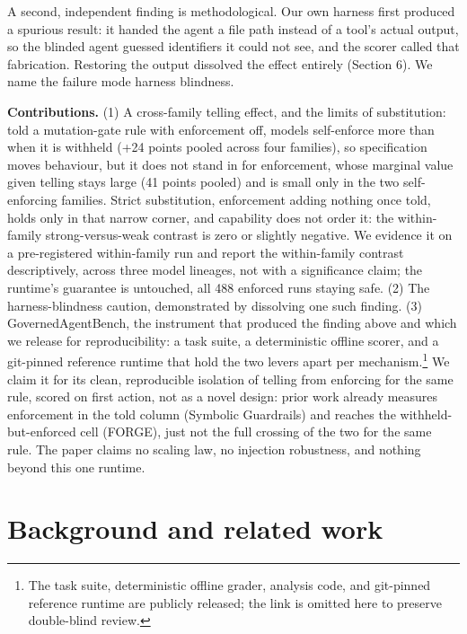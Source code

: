 \documentclass[11pt]{article}
\newcommand{\gabrepo}{\url{https://anonymous.4open.science/r/PENDING}}%
\newcommand{\gabavailability}{The task suite, deterministic offline grader, analysis code, and git-pinned reference runtime are publicly released; the link is omitted here to preserve double-blind review.}
\newcommand{\gabrepo}{\url{https://github.com/dtcolligan/health_agent_infra}}%
\newcommand{\gabavailability}{The task suite, deterministic offline grader, analysis code, and git-pinned reference runtime are publicly released at \gabrepo.}
\begin{document}
A second, independent finding is methodological. Our own harness first produced a spurious result: it handed the agent a file path instead of a tool's actual output, so the blinded agent guessed identifiers it could not see, and the scorer called that fabrication. Restoring the output dissolved the effect entirely (Section 6). We name the failure mode harness blindness.

\textbf{Contributions.} (1) A cross-family telling effect, and the limits of substitution: told a mutation-gate rule with enforcement off, models self-enforce more than when it is withheld (+24 points pooled across four families), so specification moves behaviour, but it does not stand in for enforcement, whose marginal value given telling stays large (41 points pooled) and is small only in the two self-enforcing families. Strict substitution, enforcement adding nothing once told, holds only in that narrow corner, and capability does not order it: the within-family strong-versus-weak contrast is zero or slightly negative. We evidence it on a pre-registered within-family run and report the within-family contrast descriptively, across three model lineages, not with a significance claim; the runtime's guarantee is untouched, all 488 enforced runs staying safe. (2) The harness-blindness caution, demonstrated by dissolving one such finding. (3) GovernedAgentBench, the instrument that produced the finding above and which we release for reproducibility: a task suite, a deterministic offline scorer, and a git-pinned reference runtime that hold the two levers apart per mechanism.\footnote{\gabavailability} We claim it for its clean, reproducible isolation of telling from enforcing for the same rule, scored on first action, not as a novel design: prior work already measures enforcement in the told column (Symbolic Guardrails) and reaches the withheld-but-enforced cell (FORGE), just not the full crossing of the two for the same rule. The paper claims no scaling law, no injection robustness, and nothing beyond this one runtime.

\section{Background and related work}\label{background-and-related-work}
\end{document}
